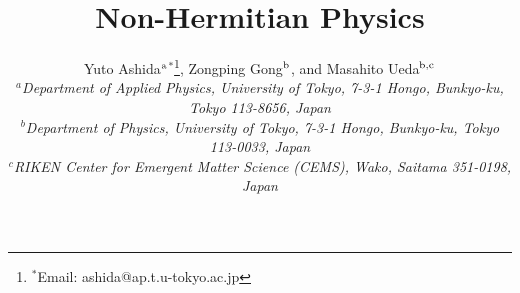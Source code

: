 \documentclass{tADP2e}
\theoremstyle{plain}
\theoremstyle{plain}
\theoremstyle{definition}
\begin{document}

\title{{\fontsize{13pt}{0pt}\selectfont Non-Hermitian Physics}}

\author{\fontsize{12pt}{0pt}\selectfont Yuto Ashida$^{\rm a}$$^{\ast}$\thanks{\fontsize{10pt}{0pt}\selectfont$^\ast$Email: ashida@ap.t.u-tokyo.ac.jp}, Zongping Gong$^{\rm b}$, and Masahito Ueda$^{\rm b,c}$
\\\vspace{12pt}
$^{a}${{\fontsize{10pt}{0pt}\em{Department of Applied Physics, University of Tokyo, 7-3-1 Hongo, Bunkyo-ku, Tokyo 113-8656, Japan}}}\\
$^{b}${{\fontsize{10pt}{0pt}\em{Department of Physics, University of Tokyo, 7-3-1 Hongo, Bunkyo-ku, Tokyo 113-0033, Japan}}}\\
$^{c}${{\fontsize{10pt}{0pt}\em{RIKEN Center for Emergent Matter Science (CEMS), Wako, Saitama 351-0198, Japan}}}
}

\maketitle
\end{document}
